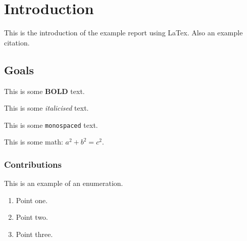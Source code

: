 \chapter{Introduction}
This is the introduction of the example report using LaTex\cite{lamport1986document}. Also an example citation.

\section{Goals}
This is some \textbf{BOLD} text.

This is some \textit{italicised} text.

This is some \texttt{monospaced} text.

This is some math: $a^2 + b^2 = c^2$.

\subsection{Contributions}
This is an example of an enumeration.

\begin{enumerate}
    \item Point one.
    \item Point two.
    \item Point three.
\end{enumerate}